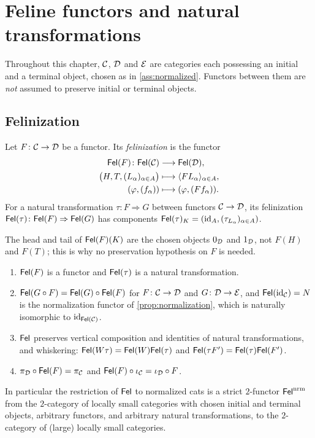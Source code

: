 \chapter{Feline functors and natural transformations}\label{ch:functors}

\begin{assumption}\label{ass:ch5}
Throughout this chapter, $\mathcal{C}$, $\mathcal{D}$ and $\mathcal{E}$ are categories each possessing
an initial and a terminal object, chosen as in \cref{ass:normalized}. Functors
between them are \emph{not} assumed to preserve initial or terminal objects.
\end{assumption}

\section{Felinization}\label{sec:felinization}

\begin{definition}\label{def:Fel-functor}
Let $F\colon\mathcal{C}\to\mathcal{D}$ be a functor. Its \emph{felinization} is the functor
\[
\begin{aligned}
\mathsf{Fel}(F)\colon\mathsf{Fel}(\mathcal{C})&\longrightarrow\mathsf{Fel}(\mathcal{D}),\\
\bigl(H,T,(L_\alpha)_{\alpha\in A}\bigr)&\longmapsto\langle F L_\alpha\rangle_{\alpha\in A},\\
(\varphi,(f_\alpha))&\longmapsto(\varphi,(Ff_\alpha)).
\end{aligned}
\]
For a natural transformation $\tau\colon F\Rightarrow G$ between functors
$\mathcal{C}\to\mathcal{D}$, its felinization $\mathsf{Fel}(\tau)\colon\mathsf{Fel}(F)\Rightarrow\mathsf{Fel}(G)$ has
components $\mathsf{Fel}(\tau)_K=(\mathrm{id}_A,(\tau_{L_\alpha})_{\alpha\in A})$.
\end{definition}

The head and tail of $\mathsf{Fel}(F)(K)$ are the chosen objects $0_{\mathcal{D}}$ and $1_{\mathcal{D}}$,
not $F(H)$ and $F(T)$; this is why no preservation hypothesis on $F$ is needed.

\begin{proposition}\label{prop:Fel-2functor}
\begin{enumerate}
\item $\mathsf{Fel}(F)$ is a functor and $\mathsf{Fel}(\tau)$ is a natural transformation.
\item $\mathsf{Fel}(G\circ F)=\mathsf{Fel}(G)\circ\mathsf{Fel}(F)$ for $F\colon\mathcal{C}\to\mathcal{D}$ and
  $G\colon\mathcal{D}\to\mathcal{E}$, and $\mathsf{Fel}(\mathrm{id}_{\mathcal{C}})=N$ is the normalization functor of
  \cref{prop:normalization}, which is naturally isomorphic to $\mathrm{id}_{\mathsf{Fel}(\mathcal{C})}$.
\item $\mathsf{Fel}$ preserves vertical composition and identities of natural
  transformations, and whiskering: $\mathsf{Fel}(W\tau)=\mathsf{Fel}(W)\mathsf{Fel}(\tau)$ and
  $\mathsf{Fel}(\tau F')=\mathsf{Fel}(\tau)\mathsf{Fel}(F')$.
\item $\pi_{\mathcal{D}}\circ\mathsf{Fel}(F)=\pi_{\mathcal{C}}$ and $\mathsf{Fel}(F)\circ\iota_{\mathcal{C}}=\iota_{\mathcal{D}}\circ F$.
\end{enumerate}
In particular the restriction of $\mathsf{Fel}$ to normalized cats is a strict
$2$-functor $\mathsf{Fel}^{\mathrm{nrm}}$ from the $2$-category of locally small categories
with chosen initial and terminal objects, arbitrary functors, and arbitrary
natural transformations, to the $2$-category of (large) locally small
categories.
\end{proposition}

